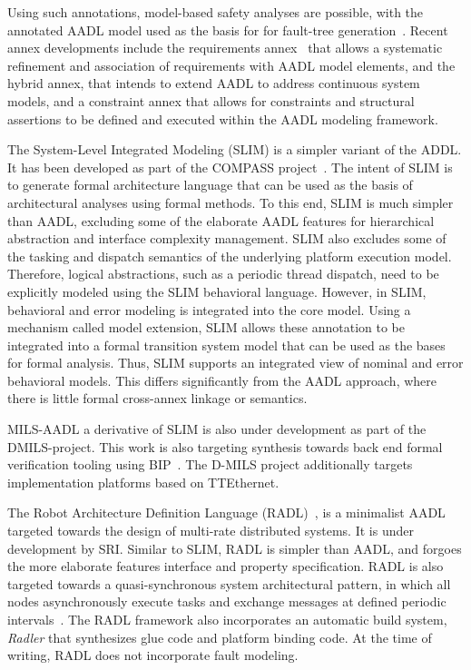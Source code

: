 Using such annotations, model-based safety analyses are possible, with the annotated AADL model used as the basis for for fault-tree generation~\cite{joshi2007automatic}. Recent annex developments include the requirements annex~\cite{blouin2011defining} that allows a systematic refinement and  association of requirements with AADL model elements, and the hybrid annex, that intends to  extend AADL to address continuous system
models, and a constraint annex that allows for constraints and structural assertions to be defined and executed  within the AADL modeling framework.

The System-Level Integrated Modeling (SLIM) is a simpler variant of the ADDL. It
has been developed as part of the COMPASS project~\cite{bozzano2009compass,gong2013automated}. The intent of SLIM is to generate
formal architecture language that can be used as the basis of architectural
analyses using formal methods. To this end, SLIM is much simpler than AADL,
excluding some of the elaborate AADL features for  hierarchical abstraction and
interface complexity management. SLIM also excludes some of the tasking and
dispatch semantics of the underlying platform execution model. Therefore,
logical abstractions, such as a periodic thread dispatch, need to be explicitly
modeled  using the SLIM behavioral language.  However, in SLIM,  behavioral and
error modeling is integrated into the core model. Using a mechanism called model
extension, SLIM allows these annotation to be integrated into a  formal
transition system model that can be used as the bases for formal analysis. Thus, SLIM supports an integrated view of nominal and error behavioral models.  This differs significantly from the AADL approach, where there is little  formal cross-annex linkage or semantics.

MILS-AADL a derivative of SLIM is also under development as part of the DMILS-project\cite{dmils}.
This work is also targeting synthesis towards back end formal verification tooling using BIP~\cite{basu2011rigorous}. The D-MILS project additionally targets implementation platforms based on TTEthernet.

The Robot Architecture Definition Language (RADL)~\cite{li2014radl}, is a minimalist  AADL targeted towards the design of multi-rate distributed systems. It is under development by SRI. Similar to SLIM, RADL is simpler than AADL, and forgoes the more elaborate features interface and property specification.  RADL is also targeted towards a quasi-synchronous system architectural pattern, in which all nodes asynchronously execute  tasks and exchange messages at defined periodic intervals~\cite{radl}. The RADL framework also incorporates an automatic build system, \emph{Radler} that synthesizes  glue code and platform binding code. At the time of writing, RADL does not incorporate fault  modeling.

